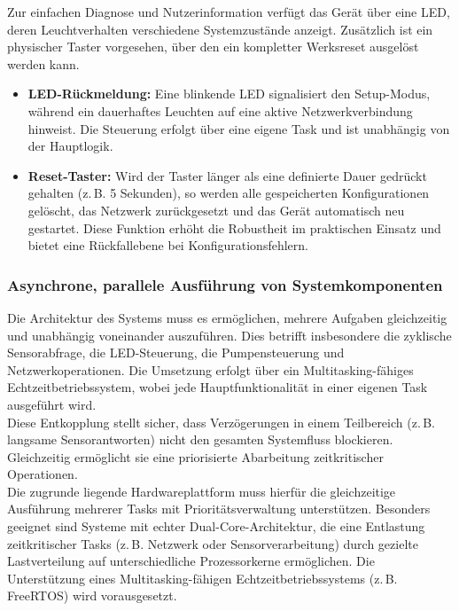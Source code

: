 Zur einfachen Diagnose und Nutzerinformation verfügt das Gerät über eine LED, deren Leuchtverhalten verschiedene Systemzustände anzeigt. Zusätzlich ist ein physischer Taster vorgesehen, über den ein kompletter Werksreset ausgelöst werden kann.

\begin{itemize}
	\item \textbf{LED-Rückmeldung:} Eine blinkende LED signalisiert den Setup-Modus, während ein dauerhaftes Leuchten auf eine aktive Netzwerkverbindung hinweist. Die Steuerung erfolgt über eine eigene Task und ist unabhängig von der Hauptlogik.
	
	\item \textbf{Reset-Taster:} Wird der Taster länger als eine definierte Dauer gedrückt gehalten (z.\,B. 5 Sekunden), so werden alle gespeicherten Konfigurationen gelöscht, das Netzwerk zurückgesetzt und das Gerät automatisch neu gestartet. Diese Funktion erhöht die Robustheit im praktischen Einsatz und bietet eine Rückfallebene bei Konfigurationsfehlern.
\end{itemize}

\subsubsection{Asynchrone, parallele Ausführung von Systemkomponenten}

Die Architektur des Systems muss es ermöglichen, mehrere Aufgaben gleichzeitig und unabhängig voneinander auszuführen. Dies betrifft insbesondere die zyklische Sensorabfrage, die LED-Steuerung, die Pumpensteuerung und Netzwerkoperationen. Die Umsetzung erfolgt über ein Multitasking-fähiges Echtzeitbetriebssystem, wobei jede Hauptfunktionalität in einer eigenen Task ausgeführt wird.
\\
Diese Entkopplung stellt sicher, dass Verzögerungen in einem Teilbereich (z.\,B. langsame Sensorantworten) nicht den gesamten Systemfluss blockieren. Gleichzeitig ermöglicht sie eine priorisierte Abarbeitung zeitkritischer Operationen.
\\
Die zugrunde liegende Hardwareplattform muss hierfür die gleichzeitige Ausführung mehrerer Tasks mit Prioritätsverwaltung unterstützen. Besonders geeignet sind Systeme mit echter Dual-Core-Architektur, die eine Entlastung zeitkritischer Tasks (z.\,B. Netzwerk oder Sensorverarbeitung) durch gezielte Lastverteilung auf unterschiedliche Prozessorkerne ermöglichen. Die Unterstützung eines Multitasking-fähigen Echtzeitbetriebssystems (z.\,B. FreeRTOS) wird vorausgesetzt.

